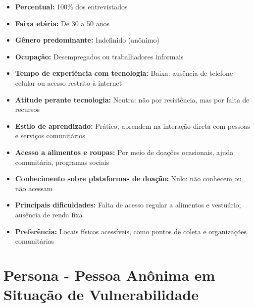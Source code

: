 \documentclass[a4paper,12pt]{article}
\begin{document}
\begin{itemize}
    \item \textbf{Percentual:} 100\% dos entrevistados
    \item \textbf{Faixa etária:} De 30 a 50 anos
    \item \textbf{Gênero predominante:} Indefinido (anônimo)
    \item \textbf{Ocupação:} Desempregados ou trabalhadores informais
    \item \textbf{Tempo de experiência com tecnologia:} Baixa: ausência de telefone celular ou acesso restrito à internet
    \item \textbf{Atitude perante tecnologia:} Neutra: não por resistência, mas por falta de recursos
    \item \textbf{Estilo de aprendizado:} Prático, aprendem na interação direta com pessoas e serviços comunitários
    \item \textbf{Acesso a alimentos e roupas:} Por meio de doações ocasionais, ajuda comunitária, programas sociais
    \item \textbf{Conhecimento sobre plataformas de doação:} Nulo: não conhecem ou não acessam
    \item \textbf{Principais dificuldades:} Falta de acesso regular a alimentos e vestuário; ausência de renda fixa
    \item \textbf{Preferência:} Locais físicos acessíveis, como pontos de coleta e organizações comunitárias
\end{itemize}

\section{Persona - Pessoa Anônima em Situação de Vulnerabilidade}
\end{document}
